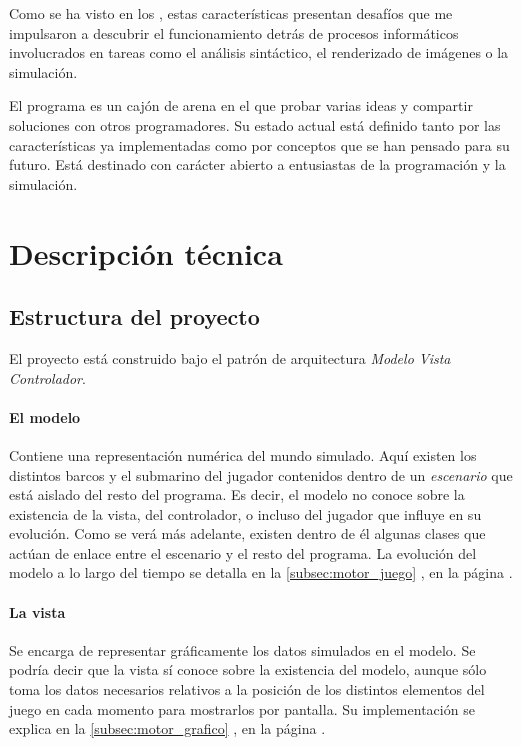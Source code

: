 \documentclass[a4paper,
	11pt,
	parskip=full,
	bibliography=totoc,
	twoside
	]{scrartcl}
\let\oldsection\section
\def\section{\cleardoubleoddpage\oldsection}
\begin{document}
	Como se ha visto en los , estas características presentan desafíos que me impulsaron a descubrir el funcionamiento detrás de procesos informáticos involucrados en tareas como el análisis sintáctico, el renderizado de imágenes o la simulación.
	
	El programa es un cajón de arena en el que probar varias ideas y compartir soluciones con otros programadores. Su estado actual está definido tanto por las características ya implementadas como por conceptos que se han pensado para su futuro. Está destinado con carácter abierto a entusiastas de la programación y la simulación.

\section{Descripción técnica}
\label{sec:desc_tecnica}
	\subsection{Estructura del proyecto}
	\label{subsec:estructura}
		El proyecto está construido bajo el patrón de arquitectura \textit{Modelo Vista Controlador}.
		
		\paragraph{El modelo}
			Contiene una representación numérica del mundo simulado. Aquí existen los distintos barcos y el submarino del jugador contenidos dentro de un \textit{escenario} que está aislado del resto del programa. Es decir, el modelo no conoce sobre la existencia de la vista, del controlador, o incluso del jugador que influye en su evolución. Como se verá más adelante, existen dentro de él algunas clases que actúan de enlace entre el escenario y el resto del programa. La evolución del modelo a lo largo del tiempo se detalla en la \autoref{subsec:motor_juego} , en la página \pageref{subsec:motor_juego}.
					
		\paragraph{La vista}
			Se encarga de representar gráficamente los datos simulados en el modelo. Se podría decir que la vista sí conoce sobre la existencia del modelo, aunque sólo toma los datos necesarios relativos a la posición de los distintos elementos del juego en cada momento para mostrarlos por pantalla. Su implementación se explica en la \autoref{subsec:motor_grafico} , en la página \pageref{subsec:motor_grafico}.
			
\end{document}
